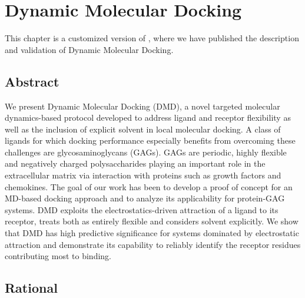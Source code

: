 \chapter{Dynamic Molecular Docking}
\label{chapter:dmd}

This chapter is a customized version of \cite{dmd_samsonov_gehrcke_2014}, where
we have published the description and validation of Dynamic Molecular Docking.


\section{Abstract}
We present Dynamic Molecular Docking (DMD), a novel
targeted molecular dy\-namics-based protocol developed to address ligand and
receptor flexibility as well as the inclusion of explicit solvent in local
molecular docking. A class of ligands for which docking performance especially
benefits from overcoming these challenges are glycosaminoglycans (GAGs). GAGs
are periodic, highly flexible and negatively charged polysaccharides playing an
important role in the extracellular matrix via interaction with proteins such as
growth factors and chemokines. The goal of our work has been to develop a proof
of concept for an MD-based docking approach and to analyze its applicability for
protein-GAG systems. DMD exploits the electrostatics-driven attraction of a
ligand to its receptor, treats both as entirely flexible and considers solvent
explicitly. We show that DMD has high predictive significance for systems
dominated by electrostatic attraction and demonstrate its capability to reliably
identify the receptor residues contributing most to binding.

\section{Rational}


